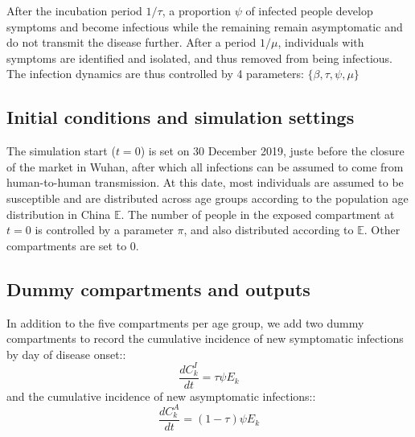 \documentclass{article}
\begin{document}
After the incubation period $1/\tau$, a proportion $\psi$ of infected people develop symptoms and become infectious while the remaining remain asymptomatic and do not transmit the disease further. 
After a period $1/\mu$, individuals with symptoms are identified and isolated, and thus removed from being infectious.
The infection dynamics are thus controlled by 4 parameters: $\{\beta,\tau, \psi, \mu \}$

\subsection{Initial conditions and simulation settings}

The simulation start ($t=0$) is set on 30 December 2019, juste before the closure of the market in Wuhan, after which all infections can be assumed to come from human-to-human transmission.
At this date, most individuals are assumed to be susceptible and are distributed across age groups according to the  population age distribution in China $\mathds{E}$.
The number of people in the exposed compartment at $t=0$ is controlled by a parameter $\pi$, and also distributed according to $\mathds{E}$.
Other compartments are set to 0.

\subsection{Dummy compartments and outputs}

In addition to the five compartments per age group, we add two dummy compartments to record the cumulative incidence of new symptomatic infections by day of disease onset::
\begin{equation}
\frac{dC^I_k}{dt} = \tau \psi E_k
\end{equation}
and the cumulative incidence of new asymptomatic infections::
\begin{equation}
\frac{dC^A_k}{dt} = (1-\tau) \psi E_k
\end{equation}
\end{document}
